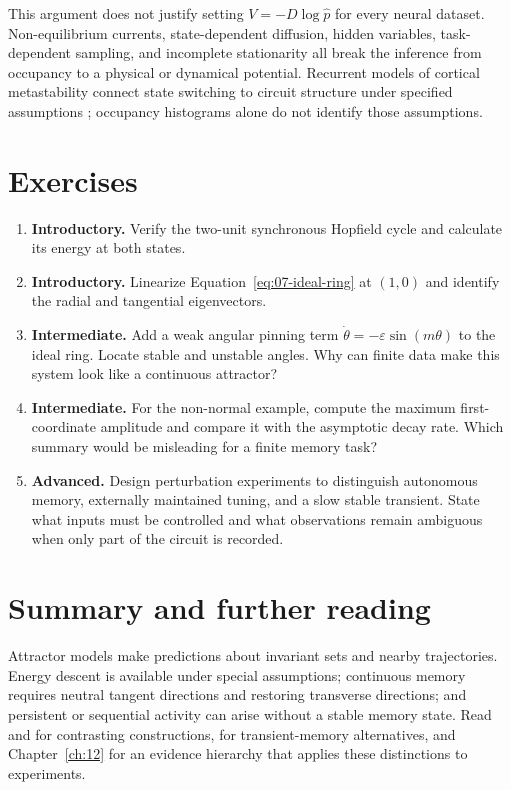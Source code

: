 This argument does not justify setting $V=-D\log\hat p$ for every neural dataset. Non-equilibrium currents, state-dependent diffusion, hidden variables, task-dependent sampling, and incomplete stationarity all break the inference from occupancy to a physical or dynamical potential. Recurrent models of cortical metastability connect state switching to circuit structure under specified assumptions \citep{app_mazzucato2015}; occupancy histograms alone do not identify those assumptions.

\section{Exercises}
\begin{enumerate}
\item \textbf{Introductory.} Verify the two-unit synchronous Hopfield cycle and calculate its energy at both states.
\item \textbf{Introductory.} Linearize Equation~\eqref{eq:07-ideal-ring} at $(1,0)$ and identify the radial and tangential eigenvectors.
\item \textbf{Intermediate.} Add a weak angular pinning term $\dot\theta=-\varepsilon\sin(m\theta)$ to the ideal ring. Locate stable and unstable angles. Why can finite data make this system look like a continuous attractor?
\item \textbf{Intermediate.} For the non-normal example, compute the maximum first-coordinate amplitude and compare it with the asymptotic decay rate. Which summary would be misleading for a finite memory task?
\item \textbf{Advanced.} Design perturbation experiments to distinguish autonomous memory, externally maintained tuning, and a slow stable transient. State what inputs must be controlled and what observations remain ambiguous when only part of the circuit is recorded.
\end{enumerate}

\section{Summary and further reading}
Attractor models make predictions about invariant sets and nearby trajectories. Energy descent is available under special assumptions; continuous memory requires neutral tangent directions and restoring transverse directions; and persistent or sequential activity can arise without a stable memory state. Read \citet{app_hopfield1982} and \citet{app_zhang1996} for contrasting constructions, \citet{app_goldman2009} for transient-memory alternatives, and Chapter~\ref{ch:12} for an evidence hierarchy that applies these distinctions to experiments.
